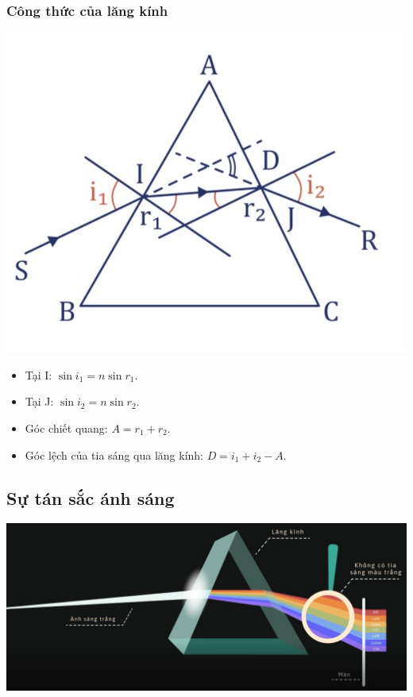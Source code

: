 \subsubsection{Công thức của lăng kính}
\begin{center}
	\includegraphics[scale=0.45]{../figs/VN12-PH-32-L-019-1-2.jpg}
\end{center}
\begin{itemize}
	\item Tại I: $\sin i_1=n\sin r_1$.
	\item Tại J: $\sin i_2=n\sin r_2$.
	\item Góc chiết quang: $A=r_1+r_2$.
	\item Góc lệch của tia sáng qua lăng kính: $D=i_1+i_2-A$.
\end{itemize}


\subsection{Sự tán sắc ánh sáng}
\begin{center}
	\includegraphics[width=\linewidth]{../figs/VN12-PH-32-L-019-1-3.jpg}
\end{center}

